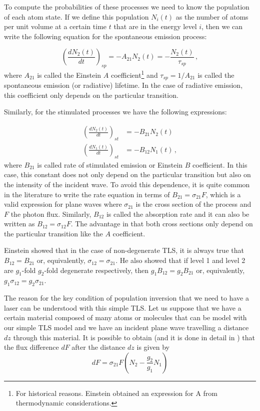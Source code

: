 \documentclass[11pt,a4paper]{article}
\begin{document}
To compute the probabilities of these processes we need to know the population of each atom state. If we define this population $N_i(t)$ as the number of atoms per unit volume at a certain time $t$ that are in the energy level $i$, then we can write the following equation for the spontaneous emission process:

\begin{equation}\label{eq:spontaneous_emission}
\left(\frac{dN_2(t)}{dt}\right)_{sp}=-A_{21}N_2(t)=-\frac{N_2(t)}{\tau_{sp}}\,,
\end{equation}
where $A_{21}$ is called the Einstein $A$ coefficient\footnote{For historical reasons. Einstein obtained an expression for A from thermodynamic considerations.} and $\tau_{sp}=1/A_{21}$ is called the spontaneous emission (or radiative) lifetime. In the case of radiative emission, this coefficient only depends on the particular transition.

Similarly, for the stimulated processes we have the following expressions:

\begin{align}\label{eq:stimulated_emission}
\left(\frac{dN_2(t)}{dt}\right)_{st}&=-B_{21}N_2(t)\\ \label{eq:absorption}
\left(\frac{dN_1(t)}{dt}\right)_{st}&=-B_{12}N_1(t)\,,
\end{align}
where $B_{21}$ is called rate of stimulated emission or Einstein $B$ coefficient. In this case, this constant does not only depend on the particular transition but also on the intensity of the incident wave. To avoid this dependence, it is quite common in the literature to write the rate equation in terms of $B_{21}=\sigma_{21}F$, which is a valid expression for plane waves where $\sigma_{21}$ is the cross section of the process and $F$ the photon flux. Similarly, $B_{12}$ is called the absorption rate and it can also be written as $B_{12}=\sigma_{12}F$. The advantage in that both cross sections only depend on the particular transition like the $A$ coefficient.

Einstein showed that in the case of non-degenerate TLS, it is always true that $B_{12}=B_{21}$ or, equivalently,  $\sigma_{12}=\sigma_{21}$. He also showed that if level 1 and level 2 are $g_1$-fold $g_2$-fold degenerate respectively, then $g_1B_{12}=g_2B_{21}$ or, equivalently, $g_1\sigma_{12}=g_2\sigma_{21}$.

The reason for the key condition of population inversion that we need to have a laser can be understood with this simple TLS. Let us suppose that we have a certain material composed of many atoms or molecules that can be model with our simple TLS model and we have an incident plane wave travelling a distance $dz$ through this material. It is possible to obtain (and it is done in detail in \cite{svelto2010principles}) that the flux difference $dF$ after the distance $dz$ is given by
\begin{equation}\label{eq:dF}
dF=\sigma_{21}F\left(N_2-\frac{g_2}{g_1}N_1\right)
\end{equation}
\end{document}
